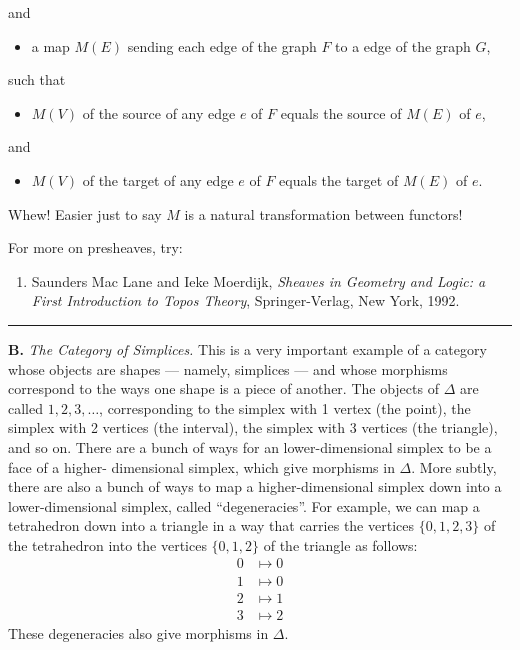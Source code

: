 \documentclass{article}
\def\tightlist{}
\begin{document}
and

\begin{itemize}
\tightlist
\item
  a map \(M(E)\) sending each edge of the graph \(F\) to a edge of the
  graph \(G\),
\end{itemize}

such that

\begin{itemize}
\tightlist
\item
  \(M(V)\) of the source of any edge \(e\) of \(F\) equals the source of
  \(M(E)\) of \(e\),
\end{itemize}

and

\begin{itemize}
\tightlist
\item
  \(M(V)\) of the target of any edge \(e\) of \(F\) equals the target of
  \(M(E)\) of \(e\).
\end{itemize}

Whew! Easier just to say \(M\) is a natural transformation between
functors!

For more on presheaves, try:

\begin{enumerate}
\def\labelenumi{\arabic{enumi})}
\setcounter{enumi}{1}
\tightlist
\item
  Saunders Mac Lane and Ieke Moerdijk, \emph{Sheaves in Geometry and
  Logic: a First Introduction to Topos Theory}, Springer-Verlag, New
  York, 1992.
\end{enumerate}

\begin{center}\rule{0.5\linewidth}{0.5pt}\end{center}

\textbf{B.} \emph{The Category of Simplices.} This is a very important
example of a category whose objects are shapes --- namely, simplices ---
and whose morphisms correspond to the ways one shape is a piece of
another. The objects of \(\Delta\) are called \(1, 2, 3, \ldots\),
corresponding to the simplex with 1 vertex (the point), the simplex with
2 vertices (the interval), the simplex with 3 vertices (the triangle),
and so on. There are a bunch of ways for an lower-dimensional simplex to
be a face of a higher- dimensional simplex, which give morphisms in
\(\Delta\). More subtly, there are also a bunch of ways to map a
higher-dimensional simplex down into a lower-dimensional simplex, called
``degeneracies''. For example, we can map a tetrahedron down into a
triangle in a way that carries the vertices \(\{0,1,2,3\}\) of the
tetrahedron into the vertices \(\{0,1,2\}\) of the triangle as follows:
\[
  \begin{aligned}
    0&\mapsto0
  \\1&\mapsto0
  \\2&\mapsto1
  \\3&\mapsto2
  \end{aligned}
\] These degeneracies also give morphisms in \(\Delta\).
\end{document}
